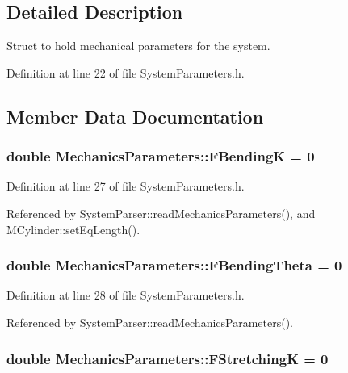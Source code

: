 \subsection{Detailed Description}
Struct to hold mechanical parameters for the system. 

Definition at line 22 of file System\+Parameters.\+h.



\subsection{Member Data Documentation}
\hypertarget{structMechanicsParameters_aa13b8fd35ef9f6574981c411b535fb83}{
\subsubsection[{F\+Bending\+K}]{\setlength{\rightskip}{0pt plus 5cm}double Mechanics\+Parameters\+::\+F\+Bending\+K = 0}}\label{structMechanicsParameters_aa13b8fd35ef9f6574981c411b535fb83}


Definition at line 27 of file System\+Parameters.\+h.



Referenced by System\+Parser\+::read\+Mechanics\+Parameters(), and M\+Cylinder\+::set\+Eq\+Length().

\hypertarget{structMechanicsParameters_a143107fd6c26d306f4d57e1b006cccb5}{
\subsubsection[{F\+Bending\+Theta}]{\setlength{\rightskip}{0pt plus 5cm}double Mechanics\+Parameters\+::\+F\+Bending\+Theta = 0}}\label{structMechanicsParameters_a143107fd6c26d306f4d57e1b006cccb5}


Definition at line 28 of file System\+Parameters.\+h.



Referenced by System\+Parser\+::read\+Mechanics\+Parameters().

\hypertarget{structMechanicsParameters_ab4155933a1fc9e47f67ec6ac71efb1bf}{
\subsubsection[{F\+Stretching\+K}]{\setlength{\rightskip}{0pt plus 5cm}double Mechanics\+Parameters\+::\+F\+Stretching\+K = 0}}\label{structMechanicsParameters_ab4155933a1fc9e47f67ec6ac71efb1bf}



